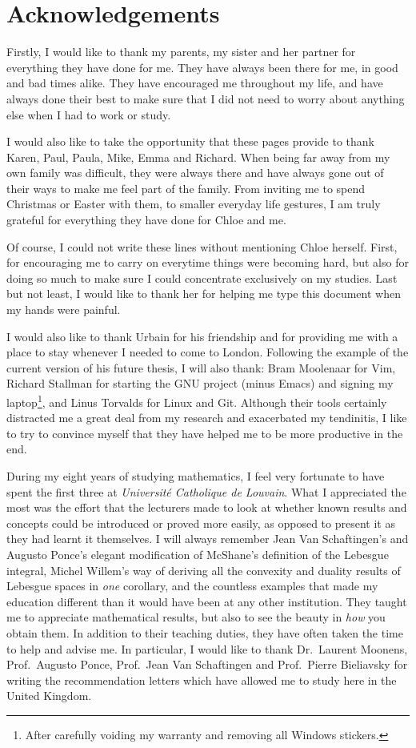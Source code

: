\chapter*{Acknowledgements}

Firstly, I would like to thank my parents, my sister and her partner for everything they have done for me.
They have always been there for me,
in good and bad times alike.
They have encouraged me throughout my life,
and have always done their best to make sure that I did not need to worry about anything else when I had to work or study.

I would also like to take the opportunity that these pages provide to thank Karen, Paul, Paula, Mike, Emma and Richard.
When being far away from my own family was difficult,
they were always there and have always gone out of their ways to make me feel part of the family.
From inviting me to spend Christmas or Easter with them,
to smaller everyday life gestures,
I am truly grateful for everything they have done for Chloe and me.

Of course,
I could not write these lines without mentioning Chloe herself.
First, for encouraging me to carry on everytime things were becoming hard,
but also for doing so much to make sure I could concentrate exclusively on my studies.
Last but not least,
I would like to thank her for helping me type this document
when my hands were painful.

I would also like to thank Urbain for his friendship and for providing me with a place to stay whenever I needed to come to London.
Following the example of the current version of his future thesis,
I will also thank:
Bram Moolenaar for Vim,
Richard Stallman for starting the GNU project (minus Emacs) and signing my laptop\footnote{After carefully voiding my warranty and removing all Windows stickers.},
and Linus Torvalds for Linux and Git.
Although their tools certainly distracted me a great deal from my research
and exacerbated my tendinitis,
I like to try to convince myself that they have helped me to be more productive in the end.

During my eight years of studying mathematics,
I feel very fortunate to have spent the first three at \emph{Universit\'e Catholique de Louvain}.
What I appreciated the most was the effort that the lecturers made to look at
whether known results and concepts could be introduced or proved more easily,
as opposed to present it as they had learnt it themselves.
I will always remember Jean Van Schaftingen's and Augusto Ponce's elegant modification of McShane's definition of the Lebesgue integral,
Michel Willem's way of deriving all the convexity and duality results of Lebesgue spaces in \emph{one} corollary,
and the countless examples that made my education different than it would have been at any other institution.
They taught me to appreciate mathematical results,
but also to see the beauty in \emph{how} you obtain them.
In addition to their teaching duties,
they have often taken the time to help and advise me.
In particular,
I would like to thank Dr.\ Laurent Moonens,
Prof.\ Augusto Ponce, Prof.\ Jean Van Schaftingen and Prof.\ Pierre Bieliavsky for writing the recommendation letters which have allowed me to study here in the United Kingdom.

